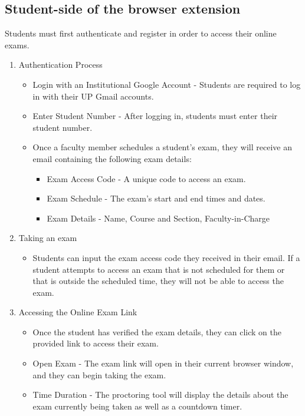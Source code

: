 \documentclass{icsthesis}
\begin{document}
\begin{mainmatter}
\begin{enumerate}
\end{enumerate}

\subsection{Student-side of the browser extension}
Students must first authenticate and register in order to access their online exams.
\begin{enumerate}
    \item Authentication Process
        \begin{itemize}
            \item Login with an Institutional Google Account -  Students are required to log in with their UP Gmail accounts.
            \item Enter Student Number - After logging in, students must enter their student number.
            \item Once a faculty member schedules a student's exam, they will receive an email containing the following exam details:
                \begin{itemize}
                    \item Exam Access Code - A unique code to access an exam.
                    \item Exam Schedule - The exam's start and end times and dates.
                    \item Exam Details - Name, Course and Section, Faculty-in-Charge
                \end{itemize}
        \end{itemize}
        \item Taking an exam
        \begin{itemize}
            \item Students can input the exam access code they received in their email. If a student attempts to access an exam that is not scheduled for them or that is outside the scheduled time, they will not be able to access the exam.
        \end{itemize}
        \item Accessing the Online Exam Link
        \begin{itemize}
            \item Once the student has verified the exam details, they can click on the provided link to access their exam.
            \item Open Exam - The exam link will open in their current browser window, and they can begin taking the exam.
            \item Time Duration - The proctoring tool will display the details about the exam currently being taken as well as a countdown timer.


\end{itemize}
\end{enumerate}
\end{mainmatter}
\end{document}
